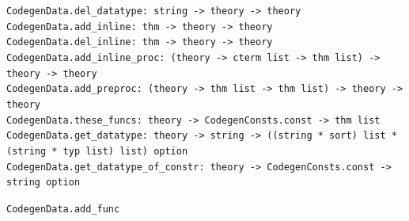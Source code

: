 \begin{isabellebody}
\begin{isamarkuptext}
\begin{mldecls}
  \verb|CodegenData.del_datatype: string -> theory -> theory| \\
  \verb|CodegenData.add_inline: thm -> theory -> theory| \\
  \verb|CodegenData.del_inline: thm -> theory -> theory| \\
  \verb|CodegenData.add_inline_proc: (theory -> cterm list -> thm list) -> theory -> theory| \\
  \verb|CodegenData.add_preproc: (theory -> thm list -> thm list) -> theory -> theory| \\
  \verb|CodegenData.these_funcs: theory -> CodegenConsts.const -> thm list| \\
  \verb|CodegenData.get_datatype: theory -> string -> ((string * sort) list * (string * typ list) list) option| \\
  \verb|CodegenData.get_datatype_of_constr: theory -> CodegenConsts.const -> string option|
  \end{mldecls}

  \begin{description}

  \item \verb|CodegenData.add_func|~


\end{description}
\end{isamarkuptext}
\end{isabellebody}
